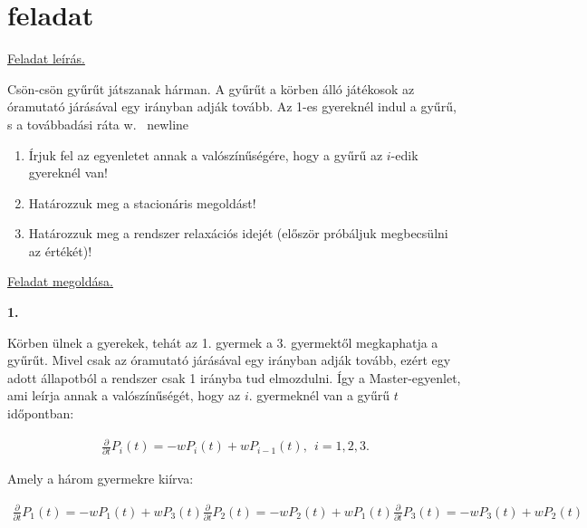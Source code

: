 \documentclass[a4paper, 12pt]{article}
\numberwithin{equation}{section}          %
\numberwithin{figure}{subsection}
\begin{document}
\newpage


\thispagestyle{empty}  

\section{feladat}

\begin{center}
\underline{Feladat leírás.}
\end{center}

Csön-csön gyűrűt játszanak hárman. A gyűrűt a körben álló játékosok az óramutató járásával egy irányban adják tovább. Az 1-es gyereknél indul a gyűrű, s a továbbadási ráta w. \ newline

\begin{enumerate}
	\item Írjuk fel az egyenletet annak a valószínűségére, hogy a gyűrű az $i$-edik gyereknél van!
	\item Határozzuk meg a stacionáris megoldást!
	\item Határozzuk meg a rendszer relaxációs idejét (először próbáljuk megbecsülni az értékét)!
\end{enumerate}


\begin{center}
\underline{Feladat megoldása.}
\end{center}
\hspace{5cm}


\textbf{\textbf{1.}} \newline

Körben ülnek a gyerekek, tehát az 1. gyermek a 3. gyermektől megkaphatja a gyűrűt. Mivel csak az
óramutató járásával egy irányban adják tovább, ezért egy adott állapotból a rendszer csak 1 irányba tud
elmozdulni. Így a Master-egyenlet, ami leírja annak a valószínűségét, hogy az $i.$ gyermeknél van a gyűrű $t$ időpontban:

\begin{center}
	\begin{gather}
	\frac{\partial}{\partial t}P_i(t) = -wP_{i}(t)+wP_{i-1}(t),\   \  i = 1,2,3.
	\end{gather}
\end{center}

Amely a három gyermekre kiírva:

\begin{center}
	\begin{gather*}
	\frac{\partial}{\partial t}P_1(t) = -wP_1(t)+wP_3(t)
	\frac{\partial}{\partial t}P_2(t) = -wP_2(t)+wP_1(t)
	\frac{\partial}{\partial t}P_3(t) = -wP_3(t)+wP_2(t)
	\end{gather*}
\end{center}
\end{document}
